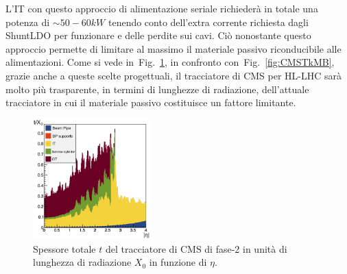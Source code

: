 L'IT con questo approccio di alimentazione seriale richieder\`a in totale una potenza di $\sim 50-60kW$ tenendo conto dell'extra corrente richiesta dagli ShuntLDO per funzionare e delle perdite sui cavi. Ci\`o nonostante questo approccio permette di limitare al massimo il materiale passivo riconducibile alle alimentazioni. Come si vede in~Fig.~\ref{fig:MBfase2}, in confronto con~Fig.~\ref{fig:CMSTkMB}, grazie anche a queste scelte progettuali, il tracciatore di CMS per HL-LHC sar\`a molto pi\`u trasparente, in termini di lunghezze di radiazione, dell'attuale tracciatore in cui il materiale passivo costituisce un fattore limitante.
\begin{figure}
\centering
\includegraphics[width=0.4\textwidth]{Immagini/MBfase2.png}
\caption{Spessore totale $t$ del tracciatore di CMS di fase-2 in unit\`a di lunghezza di radiazione $X_0$ in funzione di $\eta$.}
\label{fig:MBfase2}
\end{figure}

